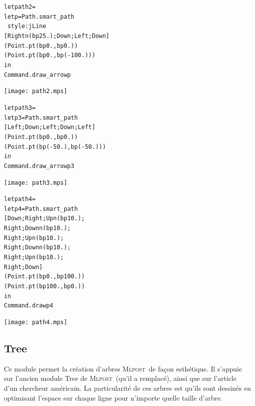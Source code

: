 \documentclass[a4paper,12pt]{article}
\newcommand{\mlpost}{\textsc{Mlpost}}
\begin{document}
\bigskip
\begin{minipage}{0.5\linewidth}
  \begin{alltt}
    let path2 = 
    let p = Path.smart_path 
    ~style:jLine
    [Rightn(bp 25.);Down;Left;Down]
    (Point.pt (bp 0.,bp 0.)) 
    (Point.pt (bp 0.,bp (-100.)))
  in
  Command.draw_arrow p
  \end{alltt}
\end{minipage}
\begin{minipage}{0.5\linewidth}
\begin{center}
\texttt{[image: path2.mps]}
\end{center}
\end{minipage}

\bigskip
\begin{minipage}{0.5\linewidth}
  \begin{alltt}
    let path3 = 
    let p3 = Path.smart_path 
    [Left;Down;Left;Down;Left] 
    (Point.pt (bp 0.,bp 0.)) 
    (Point.pt (bp (-50.),bp (-50.)))
    in
    Command.draw_arrow p3
  \end{alltt}
\end{minipage}
\begin{minipage}{0.5\linewidth}
\begin{center}
\texttt{[image: path3.mps]}
\end{center}
\end{minipage}

\bigskip
\begin{minipage}{0.5\linewidth}
  \begin{alltt}
    let path4 = 
    let p4 = Path.smart_path 
    [Down;Right;Upn (bp 10.);
      Right;Downn (bp 10.);
      Right;Upn (bp 10.);
      Right;Downn (bp 10.);
      Right;Upn (bp 10.);
      Right;Down]
    (Point.pt (bp 0.,bp 100.)) 
    (Point.pt (bp 100.,bp 0.))
    in
    Command.draw p4
  \end{alltt}
\end{minipage}
\begin{minipage}{0.5\linewidth}
\begin{center}
\texttt{[image: path4.mps]}
\end{center}
\end{minipage}


\subsection{Tree}
Ce module permet la création d'arbres \mlpost\ de façon esthétique.
Il s'appuie sur l'ancien module Tree de \mlpost\ (qu'il a remplacé), ainsi que sur l'article d'un chercheur américain. \cite{tree}
La particularité de ces arbres est qu'ils sont dessinés en optimisant l'espace sur chaque ligne pour n'importe quelle taille d'arbre.
\bigskip 
\end{document}
